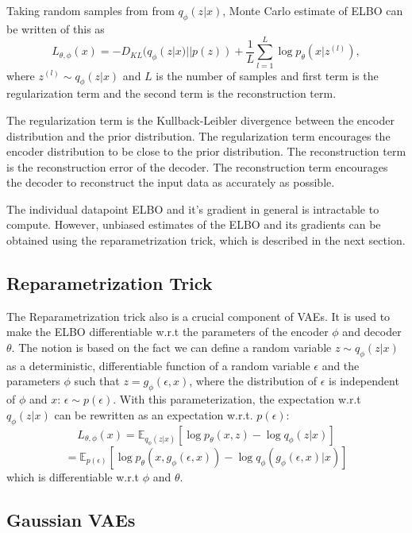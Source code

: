 Taking random samples from from $q_{\phi}(z|x)$, Monte Carlo estimate of ELBO can be written of this as
\[ L_{\theta, \phi}(x) = - D_{KL}(q_{\phi}(z|x) || p(z)) + \frac{1}{L} \sum_{l=1}^{L} \log p_{\theta}(x|z^{(l)}) ,\]
where $z^{(l)} \sim q_{\phi}(z|x)$ and $L$ is the number of samples and first term is the regularization term and the second term is the reconstruction term\cite{Kingma_2019}. 

The regularization term is the Kullback-Leibler divergence between the encoder distribution and the prior distribution. The regularization term encourages the encoder distribution to be close to the prior distribution. The reconstruction term is the reconstruction error of the decoder. The reconstruction term encourages the decoder to reconstruct the input data as accurately as possible.

The individual datapoint ELBO and it's gradient in general is intractable to compute. However, unbiased estimates of the ELBO and its gradients can be obtained using the reparametrization trick, which is described in the next section\cite{Kingma_2019}.


\subsection{Reparametrization Trick}

The Reparametrization trick also  is a crucial component of VAEs. It is used to make the ELBO differentiable w.r.t the parameters of the encoder $\phi$ and decoder $\theta$. The notion is based on the fact we can define a random variable $z \sim q_{\phi}(z|x)$ as a deterministic, differentiable function of a random variable $\epsilon$ and the parameters $\phi$ such that $z = g_{\phi}(\epsilon, x)$, where the distribution of $\epsilon$ is independent of $\phi$ and $x$: $\epsilon \sim p(\epsilon)$. With this parameterization, the expectation w.r.t $q_{\phi}(z|x)$ can be rewritten as an expectation w.r.t. $p(\epsilon)$: \[ L_{\theta, \phi}(x) = \mathbb{E}_{q_{\phi}(z|x)} [\log p_{\theta}(x, z) - \log q_{\phi}(z|x)] \]
\[ = \mathbb{E}_{p(\epsilon)} [\log p_{\theta}(x, g_{\phi}(\epsilon, x)) - \log q_{\phi}(g_{\phi}(\epsilon, x)|x)] \] which is differentiable w.r.t $\phi$ and $\theta$.



\subsection{Gaussian VAEs}

